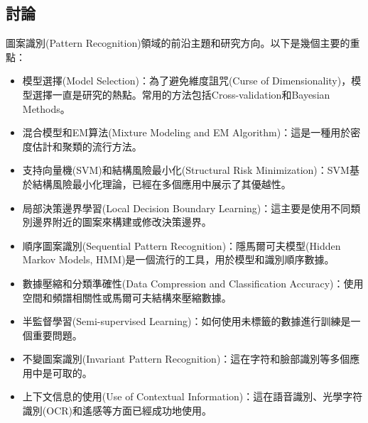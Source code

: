 \documentclass[10pt, a4paper]{article}
\begin{document}
\begin{CJK*}{UTF8}{bsmi}
\section{討論}
圖案識別(Pattern Recognition)領域的前沿主題和研究方向。以下是幾個主要的重點：
\begin{itemize}
  \item 模型選擇(Model Selection)：為了避免維度詛咒(Curse of Dimensionality)，模型選擇一直是研究的熱點。常用的方法包括Cross-validation和Bayesian Methods。
  \item 混合模型和EM算法(Mixture Modeling and EM Algorithm)：這是一種用於密度估計和聚類的流行方法。
  \item 支持向量機(SVM)和結構風險最小化(Structural Risk Minimization)：SVM基於結構風險最小化理論，已經在多個應用中展示了其優越性。
  \item 局部決策邊界學習(Local Decision Boundary Learning)：這主要是使用不同類別邊界附近的圖案來構建或修改決策邊界。
  \item 順序圖案識別(Sequential Pattern Recognition)：隱馬爾可夫模型(Hidden Markov Models, HMM)是一個流行的工具，用於模型和識別順序數據。
  \item 數據壓縮和分類準確性(Data Compression and Classification Accuracy)：使用空間和頻譜相關性或馬爾可夫結構來壓縮數據。
  \item 半監督學習(Semi-supervised Learning)：如何使用未標籤的數據進行訓練是一個重要問題。
  \item 不變圖案識別(Invariant Pattern Recognition)：這在字符和臉部識別等多個應用中是可取的。
  \item 上下文信息的使用(Use of Contextual Information)：這在語音識別、光學字符識別(OCR)和遙感等方面已經成功地使用。
\end{itemize}

\end{CJK*}
\end{document}

